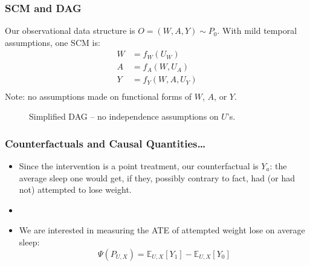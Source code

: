 \documentclass{beamer}
\newcommand{\E}{\mathbb{E}}
\begin{document}
\begin{frame}
\frametitle{SCM and DAG}

\begin{minipage}{0.55\linewidth}
Our observational data structure is $O=(W,A,Y) \sim P_0$. With mild temporal assumptions, one SCM is:
\begin{align*}
W &= f_{W}(U_{W}) \\
A &= f_{A}(W,U_{A}) \\
Y &= f_{Y}(W,A,U_{Y}) \\
\end{align*}
Note: no assumptions made on functional forms of $W$, $A$, or $Y$.
\end{minipage}
\begin{minipage}{0.4\linewidth}
  \begin{figure}[h]
    \centering
  \caption{Simplified DAG -- no independence assumptions on $U$'s.}
  \label{fig:DAG}
  \end{figure}
\end{minipage}
\end{frame}

\begin{frame}
 \frametitle{Counterfactuals and Causal Quantities\ldots}
  \begin{itemize}
    \item  Since the intervention is a point treatment, our counterfactual is $Y_{a}$: the average sleep one would get, if they, possibly contrary to fact, had (or had not) attempted to lose weight.
    \item[]
    \item  We are interested in measuring the ATE of attempted weight lose on average sleep:
    \[
      \Psi(P_{U,X}) = \E_{U,X}[Y_1] - \E_{U,X}[Y_0]
    \]
  \end{itemize}
 \end{frame}
\end{document}
